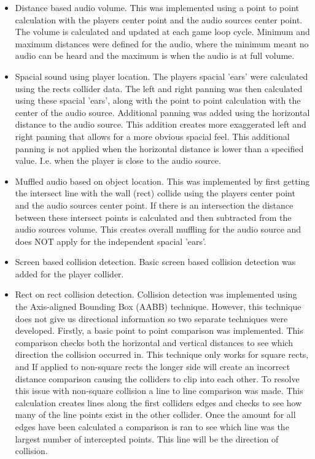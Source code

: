 \documentclass{article}
\begin{document}
\begin{itemize}

    \item Distance based audio volume. This was implemented using a point to point calculation with the players center point and the audio sources center point. The volume is calculated and updated at each game loop cycle. Minimum and maximum distances were defined for the audio, where the minimum meant no audio can be heard and the maximum is when the audio is at full volume.

    \item Spacial sound using player location. The players spacial 'ears' were calculated using the rects collider data. The left and right panning was then calculated using these spacial 'ears', along with the point to point calculation with the center of the audio source. Additional panning was added using the horizontal distance to the audio source. This addition creates more exaggerated left and right panning that allows for a more obvious spacial feel. This additional panning is not applied when the horizontal distance is lower than a specified value. I.e. when the player is close to the audio source.

    \item Muffled audio based on object location. This was implemented by first getting the intersect line with the wall (rect) collide using the players center point and the audio sources center point. If there is an intersection the distance between these intersect points is calculated and then subtracted from the audio sources volume. This creates overall muffling for the audio source and does NOT apply for the independent spacial 'ears'.

    \item Screen based collision detection. Basic screen based collision detection was added for the player collider. 

    \item Rect on rect collision detection. Collision detection was implemented using the Axis-aligned Bounding Box (AABB) technique. However, this technique does not give us directional information so two separate techniques were developed. Firstly, a basic point to point comparison was implemented. This comparison checks both the horizontal and vertical distances to see which direction the collision occurred in. This technique only works for square rects, and If applied to non-square rects the longer side will create an incorrect distance comparison causing the colliders to clip into each other. To resolve this issue with non-square collision a line to line comparison was made. This calculation creates lines along the first colliders edges and checks to see how many of the line points exist in the other collider. Once the amount for all edges have been calculated a comparison is ran to see which line was the largest number of intercepted points. This line will be the direction of collision. 
 

\end{itemize}
\end{document}
